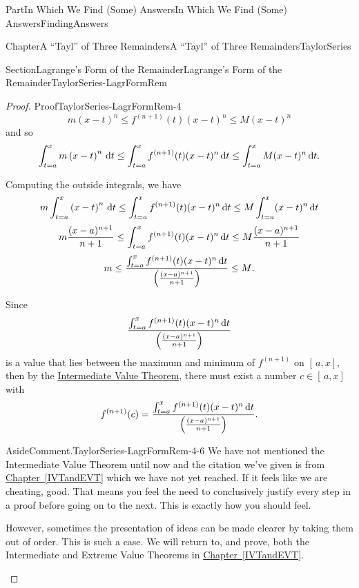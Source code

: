 \documentclass[oneside,10pt,]{book}
\newcommand{\xreffont}{\relax}
\numberwithin{equation}{part}
\newcommand{\dx}[1]{\,{\rm d}#1}
\begin{document}
\begin{partptx}{Part}{In Which We Find (Some) Answers}{}{In Which We Find (Some) Answers}{}{}{FindingAnswers}
\begin{chapterptx}{Chapter}{A ``Tayl'' of Three Remainders}{}{A ``Tayl'' of Three Remainders}{}{}{TaylorSeries}
\begin{sectionptx}{Section}{Lagrange's Form of the Remainder}{}{Lagrange's Form of the Remainder}{}{}{TaylorSeries-LagrFormRem}
\begin{proof}{Proof}{}{TaylorSeries-LagrFormRem-4}
\begin{equation}
m\left(x-t\right)^n\leq f^{(n+1)}(t)(x-t)^n\leq M(x-t)^n\label{eq_LagRem1}
\end{equation}
and so%
\begin{equation}
\int_{t=a}^xm\left(x-t\right)^n\dx{ t}\leq\int_{t=a}^xf^{(n+1)}(t)(x-t)^n\dx{ t}\leq \int_{t=a}^xM(x-t)^n\dx{ t}\text{.}\label{eq_LagRem2}
\end{equation}
%
\par
Computing the outside integrals, we have%
\begin{equation*}
m\int_{t=a}^x\left(x-t\right)^n\dx{ t}\leq\int_{t=a}^xf^{(n+1)}(t)(x-t)^n\dx{ t}\leq M\int_{t=a}^x(x-t)^n\dx{ t}
\end{equation*}
%
\begin{equation}
m\frac{(x-a)^{n+1}}{n+1}\leq\int_{t=a}^xf^{(n+1)}(t)(x-t)^n\dx{ t}\leq M\frac{(x-a)^{n+1}}{n+1}\label{eq_LagRem3}
\end{equation}
%
\begin{equation*}
m\leq\frac{\int_{t=a}^xf^{(n+1)}(t)(x-t)^n\dx{ t}}{\left(\frac{(x-a)^{n+1}}{n+1} \right)}\leq M\text{.}
\end{equation*}
%
\par
Since%
\begin{equation*}
\frac{\int_{t=a}^xf^{(n+1)}(t)(x-t)^n\dx{ t}}{\left(\frac{(x-a)^{n+1}}{n+1} \right)}
\end{equation*}
is a value that lies between the maximum and minimum of \(f^{(n+1)}\) on \([\,a,x]\), then by the \hyperref[IntermediateValueTheorem]{Intermediate Value Theorem}, there must exist a number \(c\in[\,a,x]\) with%
\begin{equation*}
f^{(n+1)}(c)=\frac{\int_{t=a}^xf^{(n+1)}(t)(x-t)^n\dx{ t}}{\left( \frac{(x-a)^{n+1}}{n+1}\right)}\text{.}
\end{equation*}
%
\begin{aside}{Aside}{Comment.}{TaylorSeries-LagrFormRem-4-6}%
We have not mentioned the Intermediate Value Theorem until now and the citation we've given is from \hyperref[IVTandEVT]{Chapter~{\xreffont\ref{IVTandEVT}}} which we have not yet reached. If it feels like we are cheating, good. That means you feel the need to conclusively justify every step in a proof before going on to the next. This is exactly how you should feel.%
\par
However, sometimes the presentation of ideas can be made clearer by taking them out of order. This is such a case. We will return to, and prove, both the Intermediate and Extreme Value Theorems in \hyperref[IVTandEVT]{Chapter~{\xreffont\ref{IVTandEVT}}}.%

\end{aside}
\end{proof}
\end{sectionptx}
\end{chapterptx}
\end{partptx}
\end{document}
